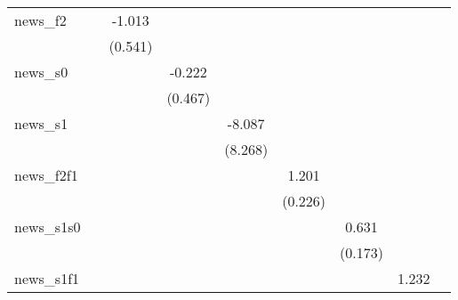 {\begin{tabular}{l*{8}{c}}
\addlinespace
news\_f2     &                     &      -1.013\sym{*}  &                     &                     &                     &                     &                     &                     \\
            &                     &     (0.541)         &                     &                     &                     &                     &                     &                     \\
\addlinespace
news\_s0     &                     &                     &      -0.222         &                     &                     &                     &                     &                     \\
            &                     &                     &     (0.467)         &                     &                     &                     &                     &                     \\
\addlinespace
news\_s1     &                     &                     &                     &      -8.087         &                     &                     &                     &                     \\
            &                     &                     &                     &     (8.268)         &                     &                     &                     &                     \\
\addlinespace
news\_f2f1   &                     &                     &                     &                     &       1.201\sym{***}&                     &                     &                     \\
            &                     &                     &                     &                     &     (0.226)         &                     &                     &                     \\
\addlinespace
news\_s1s0   &                     &                     &                     &                     &                     &       0.631\sym{***}&                     &                     \\
            &                     &                     &                     &                     &                     &     (0.173)         &                     &                     \\
\addlinespace
news\_s1f1   &                     &                     &                     &                     &                     &                     &       1.232\sym{***}&                     \\

\end{tabular}}
